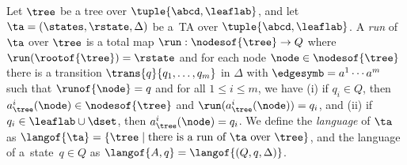 {Let $\tree$ be a tree over $\tuple{\abcd,\leaflab}$, and let $\ta = (\states,
\rstate, \Delta)$ be a~TA over $\tuple{\abcd,\leaflab}$.  A \emph{run} of~$\ta$
over $\tree$ is a total map $\run: \nodesof{\tree} \to Q$ where
$\run(\rootof{\tree}) = \rstate$ and for each node $\node \in \nodesof{\tree}$
there is a transition $\trans{q}{q_1, \dots, q_m}$ in $\Delta$ with
$\edgesymb = a^1 \cdots a^m$ such that $\runof{\node} = q$ and for all $1
\leq i \leq m$, we have (i) if $q_i \in Q$, then $a_{\tree}^i(\node) \in
\nodesof{\tree}$ and $\run(a_{\tree}^i(\node)) = q_i$, and (ii) if $q_i \in
\leaflab \cup \dset$, then $a_{\tree}^i(\node) = q_i$. 
%
%
%
%
We define the \emph{language} of $\ta$ as $\langof{\ta}= \{\tree
\mid \mbox{there is a run of $\ta$ over $\tree$} \}$, and the language of a~state~$q \in Q$ as $\langof{A, q} = \langof{(Q, q, \Delta)}$.

%

}
